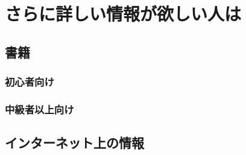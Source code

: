 \chapter{さらに詳しい情報が欲しい人は}
\label{ch:information}


\section{書籍}
\label{sec:book}

\subsection*{初心者向け}


\subsection*{中級者以上向け}


\section{インターネット上の情報}
\label{sec:internet}



